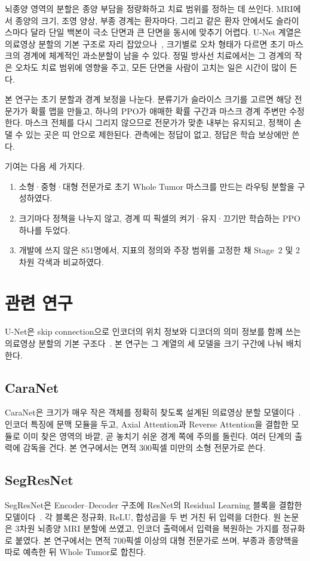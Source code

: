 \documentclass[runningheads]{llncs}
\begin{document}
뇌종양 영역의 분할은 종양 부담을 정량화하고 치료 범위를 정하는 데 쓰인다. MRI에서 종양의 크기, 조영 양상, 부종 경계는 환자마다, 그리고 같은 환자 안에서도 슬라이스마다 달라 단일 백본이 극소 단면과 큰 단면을 동시에 맞추기 어렵다. U-Net 계열은 의료영상 분할의 기본 구조로 자리 잡았으나~\cite{ronneberger2015}, 크기별로 오차 형태가 다르면 초기 마스크의 경계에 체계적인 과소분할이 남을 수 있다. 정밀 방사선 치료에서는 그 경계의 작은 오차도 치료 범위에 영향을 주고, 모든 단면을 사람이 고치는 일은 시간이 많이 든다.

본 연구는 초기 분할과 경계 보정을 나눈다. 분류기가 슬라이스 크기를 고르면 해당 전문가가 확률 맵을 만들고, 하나의 PPO가 애매한 확률 구간과 마스크 경계 주변만 수정한다. 마스크 전체를 다시 그리지 않으므로 전문가가 맞춘 내부는 유지되고, 정책이 손댈 수 있는 곳은 띠 안으로 제한된다. 관측에는 정답이 없고, 정답은 학습 보상에만 쓴다.

기여는 다음 세 가지다.
\begin{enumerate}
\item 소형·중형·대형 전문가로 초기 Whole Tumor 마스크를 만드는 라우팅 분할을 구성하였다.
\item 크기마다 정책을 나누지 않고, 경계 띠 픽셀의 켜기·유지·끄기만 학습하는 PPO 하나를 두었다.
\item 개발에 쓰지 않은 851명에서, 지표의 정의와 주장 범위를 고정한 채 Stage~2 및 2차원 각색과 비교하였다.
\end{enumerate}

\section{관련 연구}

U-Net은 skip connection으로 인코더의 위치 정보와 디코더의 의미 정보를 함께 쓰는 의료영상 분할의 기본 구조다~\cite{ronneberger2015}. 본 연구는 그 계열의 세 모델을 크기 구간에 나눠 배치한다.

\subsection{CaraNet}
CaraNet은 크기가 매우 작은 객체를 정확히 찾도록 설계된 의료영상 분할 모델이다~\cite{lou2023}. 인코더 특징에 문맥 모듈을 두고, Axial Attention과 Reverse Attention을 결합한 모듈로 이미 찾은 영역의 바깥, 곧 놓치기 쉬운 경계 쪽에 주의를 돌린다. 여러 단계의 출력에 감독을 건다. 본 연구에서는 면적 300픽셀 미만의 소형 전문가로 쓴다.

\subsection{SegResNet}
SegResNet은 Encoder--Decoder 구조에 ResNet의 Residual Learning 블록을 결합한 모델이다~\cite{myronenko2018}. 각 블록은 정규화, ReLU, 합성곱을 두 번 거친 뒤 입력을 더한다. 원 논문은 3차원 뇌종양 MRI 분할에 쓰였고, 인코더 출력에서 입력을 복원하는 가지를 정규화로 붙였다. 본 연구에서는 면적 700픽셀 이상의 대형 전문가로 쓰며, 부종과 종양핵을 따로 예측한 뒤 Whole Tumor로 합친다.
\end{document}
